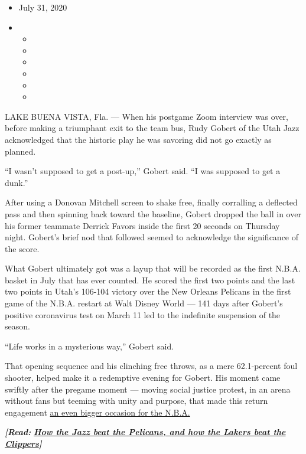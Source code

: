 \begin{itemize}
\item
  July 31, 2020
\item
  \begin{itemize}
  \item
  \item
  \item
  \item
  \item
  \item
  \end{itemize}
\end{itemize}

LAKE BUENA VISTA, Fla. --- When his postgame Zoom interview was over,
before making a triumphant exit to the team bus, Rudy Gobert of the Utah
Jazz acknowledged that the historic play he was savoring did not go
exactly as planned.

``I wasn't supposed to get a post-up,'' Gobert said. ``I was supposed to
get a dunk.''

After using a Donovan Mitchell screen to shake free, finally corralling
a deflected pass and then spinning back toward the baseline, Gobert
dropped the ball in over his former teammate Derrick Favors inside the
first 20 seconds on Thursday night. Gobert's brief nod that followed
seemed to acknowledge the significance of the score.

What Gobert ultimately got was a layup that will be recorded as the
first N.B.A. basket in July that has ever counted. He scored the first
two points and the last two points in Utah's 106-104 victory over the
New Orleans Pelicans in the first game of the N.B.A. restart at Walt
Disney World --- 141 days after Gobert's positive coronavirus test on
March 11 led to the indefinite suspension of the season.

``Life works in a mysterious way,'' Gobert said.

That opening sequence and his clinching free throws, as a mere
62.1-percent foul shooter, helped make it a redemptive evening for
Gobert. His moment came swiftly after the pregame moment --- moving
social justice protest, in an arena without fans but teeming with unity
and purpose, that made this return engagement
\href{https://www.nytimes3xbfgragh.onion/2020/07/30/sports/basketball/clippers-lakers.html}{an
even bigger occasion for the N.B.A.}

\emph{\textbf{{[}Read:}}
\textbf{\href{https://www.nytimes3xbfgragh.onion/2020/07/30/sports/basketball/clippers-lakers.html}{\emph{How
the Jazz beat the Pelicans, and how the Lakers beat the
Clippers}}\emph{{]}}}

